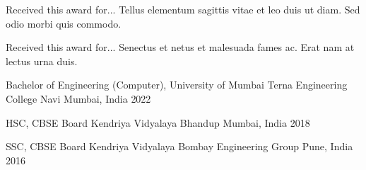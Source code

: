 \documentclass[10pt, a4paper]{sivu}
\begin{document}
\medskip

    \bigskip
    
    {Received this award for... Tellus elementum sagittis vitae et leo duis ut diam. Sed odio morbi quis commodo.}\par
    
    \smallskip 
    \dividergray
    \smallskip
    
    {Received this award for... Senectus et netus et malesuada fames ac. Erat nam at lectus urna duis.}\par
    \medskip

\medskip


\medskip
    \education
        {Bachelor of Engineering (Computer), University of Mumbai}
        {Terna Engineering College}
        {Navi Mumbai, India}
        {2022}
        \par
        \dividergray
     
        \education
        {HSC, CBSE Board}
        {Kendriya Vidyalaya Bhandup}
        {Mumbai, India}
        {2018}

        \par
        \dividergray

        \education
        {SSC, CBSE Board}
        {Kendriya Vidyalaya Bombay Engineering Group}
        {Pune, India}
        {2016}

        \par
        \dividergray
\end{document}
